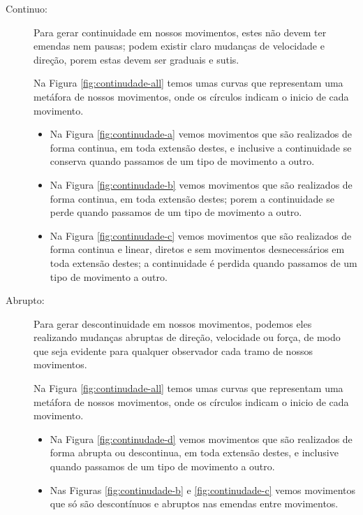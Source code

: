 \begin{description}
\item[Continuo:] Para gerar continuidade em nossos movimentos,
estes não devem ter emendas nem pausas; 
podem existir claro mudanças de velocidade e direção,
porem estas devem ser graduais e sutis.
\begin{example} 
Na Figura \ref{fig:continudade-all} temos umas curvas que representam uma metáfora de nossos movimentos,
onde os círculos indicam o inicio de cada movimento.
\begin{itemize}
\item Na Figura \ref{fig:continudade-a} vemos movimentos que são realizados de forma continua, 
em toda extensão destes, 
e inclusive a continuidade se conserva quando passamos de um tipo de movimento a outro.
\item Na Figura \ref{fig:continudade-b} vemos movimentos que são realizados de forma continua, 
em toda extensão destes;
porem a  continuidade se perde quando passamos de um tipo de movimento a outro.
\item Na Figura \ref{fig:continudade-c} vemos movimentos que são realizados de forma continua e linear,
diretos e sem movimentos desnecessários em toda extensão destes;
a continuidade é perdida quando passamos de um tipo de movimento a outro.
\end{itemize}
\end{example}

\item[Abrupto:] Para gerar descontinuidade em nossos movimentos, 
podemos eles realizando mudanças abruptas de direção, velocidade ou força,
de modo que seja evidente para qualquer observador cada tramo de nossos movimentos.
\begin{example}
Na Figura \ref{fig:continudade-all} temos umas curvas que representam uma metáfora de nossos movimentos,
onde os círculos indicam o inicio de cada movimento.
\begin{itemize}
\item Na Figura \ref{fig:continudade-d} vemos movimentos que são realizados de forma abrupta ou descontinua,
em toda extensão destes, 
e inclusive quando passamos de um tipo de movimento a outro.
\item Nas Figuras \ref{fig:continudade-b} e \ref{fig:continudade-c} 
vemos movimentos que só são descontínuos e abruptos nas emendas entre movimentos. 
\end{itemize}
\end{example}
\end{description}

